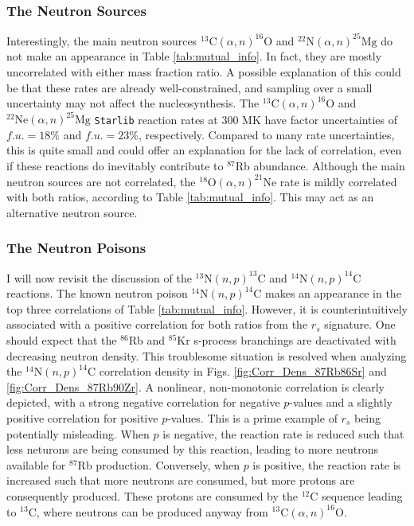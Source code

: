 \newpage

\subsubsection{The Neutron Sources}

Interestingly, the main neutron sources $^{13}\mathrm{C}(\alpha,n)^{16}\mathrm{O}$ and $^{22}\mathrm{N}(\alpha,n)^{25}\mathrm{Mg}$ do not make an appearance in Table \ref{tab:mutual_info}. In fact, they are mostly uncorrelated with either mass fraction ratio. A possible explanation of this could be that these rates are already well-constrained, and sampling over a small uncertainty may not affect the nucleosynthesis. The $^{13}\mathrm{C}(\alpha,n)^{16}\mathrm{O}$ and $^{22}\mathrm{Ne}(\alpha,n)^{25}\mathrm{Mg}$ \texttt{Starlib} reaction rates at 300 MK have factor uncertainties of $f.u. = 18\%$ and $f.u. = 23\%$, respectively. Compared to many rate uncertainties, this is quite small and could offer an explanation for the lack of correlation, even if these reactions do inevitably contribute to $^{87}$Rb abundance. Although the main neutron sources are not correlated, the $^{18}\mathrm{O}(\alpha,n)^{21}\mathrm{Ne}$ rate is mildly correlated with both ratios, according to Table \ref{tab:mutual_info}. This may act as an alternative neutron source.

\subsubsection{The Neutron Poisons}

I will now revisit the discussion of the $^{13}\mathrm{N}(n,p)^{13}\mathrm{C}$ and $^{14}\mathrm{N}(n,p)^{14}\mathrm{C}$ reactions. The known neutron poison $^{14}\mathrm{N}(n,p)^{14}\mathrm{C}$ \cite{Habing2004} makes an appearance in the top three correlations of Table \ref{tab:mutual_info}. However, it is counterintuitively associated with a positive correlation for both ratios from the $r_{s}$ signature. One should expect that the $^{86}$Rb and $^{85}$Kr s-process branchings are deactivated with decreasing neutron density. This troublesome situation is resolved when analyzing the $^{14}\mathrm{N}(n,p)^{14}\mathrm{C}$ correlation density in Figs. \ref{fig:Corr_Dens_87Rb86Sr} and \ref{fig:Corr_Dens_87Rb90Zr}. A nonlinear, non-monotonic correlation is clearly depicted, with a strong negative correlation for negative $p$-values and a slightly positive correlation for positive $p$-values. This is a prime example of $r_{s}$ being potentially misleading. When $p$ is negative, the reaction rate is reduced such that less neturons are being consumed by this reaction, leading to more neutrons available for $^{87}$Rb production. Conversely, when $p$ is positive, the reaction rate is increased such that more neutrons are consumed, but more protons are consequently produced. These protons are consumed by the $^{12}$C sequence leading to $^{13}$C, where neutrons can be produced anyway from $^{13}\mathrm{C}(\alpha,n)^{16}\mathrm{O}$.

